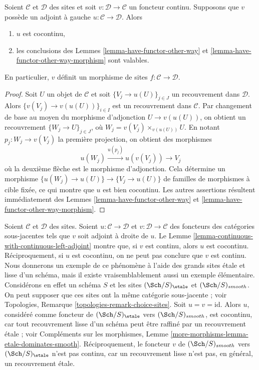 \begin{lemma}
\label{lemma-continuous-with-continuous-left-adjoint}
Soient $\mathcal{C}$ et $\mathcal{D}$ des sites et soit
$v : \mathcal{D} \to \mathcal{C}$ un foncteur continu.
Supposons que $v$ possède un adjoint à gauche
$u : \mathcal{C} \to \mathcal{D}$. Alors
\begin{enumerate}
\item $u$ est cocontinu,
\item les conclusions des Lemmes \ref{lemma-have-functor-other-way} et
\ref{lemma-have-functor-other-way-morphism} sont valables.
\end{enumerate}
En particulier, $v$ définit un morphisme de sites
$f : \mathcal{C} \to \mathcal{D}$.
\end{lemma}

\begin{proof}
Soit $U$ un objet de $\mathcal{C}$ et soit
$\{V_j \to u(U)\}_{j \in J}$ un recouvrement dans $\mathcal{D}$. Alors
$\{v(V_j) \to v(u(U))\}_{i \in I}$ est un recouvrement dans $\mathcal{C}$.
Par changement de base au moyen du morphisme d’adjonction
$U \to v(u(U))$, on obtient un recouvrement
$\{W_j \to U\}_{j \in J}$, où
$W_j = v(V_j) \times_{v(u(U))} U$. En notant
$p_j : W_j \to v(V_j)$ la première projection, on obtient des morphismes
$$
u(W_j) \xrightarrow{u(p_j)} u(v(V_j)) \longrightarrow V_j
$$
où la deuxième flèche est le morphisme d’adjonction. Cela détermine un
morphisme $\{u(W_j) \to u(U)\} \to \{V_j \to u(U)\}$ de familles de
morphismes à cible fixée, ce qui montre que $u$ est bien cocontinu. Les autres
assertions résultent immédiatement des
Lemmes \ref{lemma-have-functor-other-way} et
\ref{lemma-have-functor-other-way-morphism}.
\end{proof}

\begin{example}
\label{example-not-equivalent}
Soient $\mathcal{C}$ et $\mathcal{D}$ des sites. Soient
$u : \mathcal{C} \to \mathcal{D}$ et $v : \mathcal{D} \to \mathcal{C}$ des
foncteurs des catégories sous-jacentes tels que $v$ soit adjoint à droite de
$u$. Le Lemme \ref{lemma-continuous-with-continuous-left-adjoint} montre que,
si $v$ est continu, alors $u$ est cocontinu. Réciproquement, si $u$ est
cocontinu, on ne peut pas conclure que $v$ est continu. Nous donnerons un
exemple de ce phénomène à l’aide des grands sites \'etale et lisse d’un
schéma, mais il existe vraisemblablement aussi un exemple élémentaire.
Considérons en effet un schéma $S$ et les sites $(\Sch/S)_\etale$ et
$(\Sch/S)_{smooth}$. On peut supposer que ces sites ont la même catégorie
sous-jacente ; voir Topologies,
Remarque \ref{topologies-remark-choice-sites}.
Soit $u = v = \text{id}$. Alors $u$, considéré comme foncteur de
$(\Sch/S)_\etale$ vers $(\Sch/S)_{smooth}$, est cocontinu, car tout
recouvrement lisse d’un schéma peut être raffiné par un recouvrement \'etale ;
voir Compléments sur les morphismes,
Lemme \ref{more-morphisms-lemma-etale-dominates-smooth}.
Réciproquement, le foncteur $v$ de $(\Sch/S)_{smooth}$ vers
$(\Sch/S)_\etale$ n’est pas continu, car un recouvrement lisse n’est pas, en
général, un recouvrement \'etale.
\end{example}




